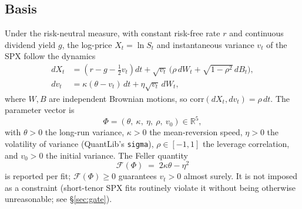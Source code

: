 \documentclass[a4paper, 11pt, reqno]{amsart}
\newcommand{\Real}{\mathbb{R}}
\begin{document}
		\subsection{Basis}
			Under the risk-neutral measure, with constant risk-free rate $r$ and continuous
			dividend yield $g$, the log-price $X_t=\ln S_t$ and instantaneous variance $v_t$ of the
			SPX follow the \citet{heston1993} dynamics
			\begin{align}
				dX_t &= \left( r - g - \tfrac{1}{2} v_t \right) dt
       			       	+ \sqrt{v_t}\,\bigl( \rho\, dW_t + \sqrt{1 - \rho^2}\, dB_t \bigr), \label{eq:level} \\
				dv_t &= \kappa(\theta - v_t)\, dt + \eta \sqrt{v_t}\, dW_t, \label{eq:variance}
			\end{align}
			where $W,B$ are independent Brownian motions, so $\mathrm{corr}(dX_t,dv_t)=\rho\,dt$.
			The parameter vector is
			\begin{equation}\label{eq:heston-params}
				\Phi = (\theta,\ \kappa,\ \eta,\ \rho,\ v_0) \in \Real^5,
			\end{equation}
			with $\theta>0$ the long-run variance, $\kappa>0$ the mean-reversion speed, $\eta>0$ the
			volatility of variance (QuantLib's \texttt{sigma}), $\rho\in[-1,1]$ the leverage
			correlation, and $v_0>0$ the initial variance. The Feller quantity \citep{feller1951}
			\begin{equation}\label{eq:feller}
				\mathcal{F}(\Phi) \;=\; 2\kappa\theta - \eta^2
			\end{equation}
			is reported per fit; $\mathcal{F}(\Phi)\ge 0$ guarantees $v_t>0$ almost surely. It is not
			imposed as a constraint (short-tenor SPX fits routinely violate it without being
			otherwise unreasonable; see \S\ref{sec:gate}).
	
\end{document}
